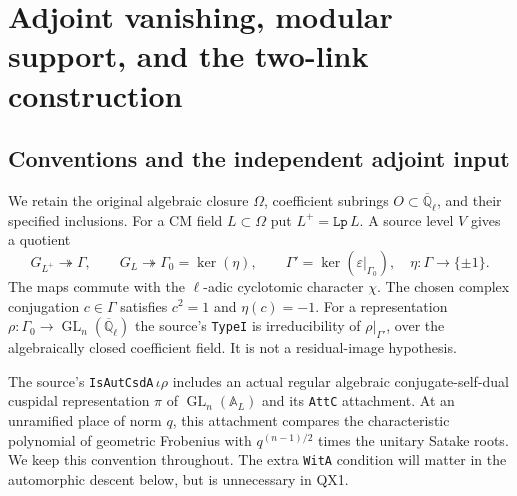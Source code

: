 \section{Adjoint vanishing, modular support, and the two-link construction}
\label{sec:symplectic-modular-support}


\subsection{Conventions and the independent adjoint input}

We retain the original algebraic closure $\Omega$, coefficient subrings
$O\subset\overline{\mathbb Q}_\ell$, and their specified inclusions.
For a CM field $L\subset\Omega$ put $L^+=\texttt{Lp}\,L$.
A source level $V$ gives a quotient
\[
 G_{L^+}\twoheadrightarrow\Gamma,\qquad
 G_L\twoheadrightarrow\Gamma_0=\ker(\eta),\qquad
 \Gamma'=\ker(\varepsilon|_{\Gamma_0}),
 \quad \eta:\Gamma\longrightarrow\{\pm1\}.
 \tag{QX.1}
\]
The maps commute with the $\ell$-adic cyclotomic character $\chi$.
The chosen complex conjugation $c\in\Gamma$ satisfies $c^2=1$ and
$\eta(c)=-1$.  For a representation $\rho:\Gamma_0\to
\operatorname{GL}_n(\overline{\mathbb Q}_\ell)$ the source's
\texttt{TypeI} is irreducibility of $\rho|_{\Gamma'}$, over the
algebraically closed coefficient field.  It is not a residual-image
hypothesis.

The source's \texttt{IsAutCsdA}$\,\iota\rho$ includes an actual regular
algebraic conjugate-self-dual cuspidal representation $\pi$ of
$\operatorname{GL}_n(\mathbb A_L)$ and its \texttt{AttC} attachment.
At an unramified place of norm $q$, this attachment compares the
characteristic polynomial of geometric Frobenius with
$q^{(n-1)/2}$ times the unitary Satake roots.  We keep this convention
throughout.  The extra \texttt{WitA} condition will matter in the
automorphic descent below, but is unnecessary in QX1.

